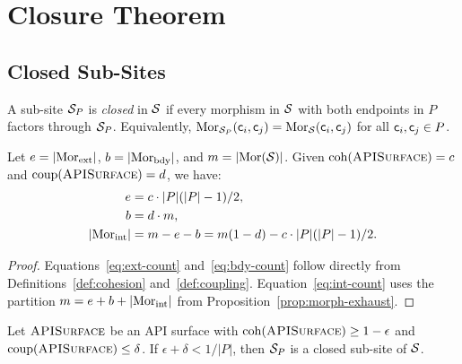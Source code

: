 \documentclass[11pt]{article}
\newcommand{\APISurface}{\textsc{APISurface}}
\newcommand{\CohIndex}{\mathrm{coh}}
\newcommand{\CoupIndex}{\mathrm{coup}}
\begin{document}
\section{Closure Theorem}\label{sec:closure}

\subsection{Closed Sub-Sites}

\begin{definition}\label{def:closed-subsite}
A sub-site $\mathcal{S}_P$ is \emph{closed} in $\mathcal{S}$ if every morphism in
$\mathcal{S}$ with both endpoints in $P$ factors through $\mathcal{S}_P$.  Equivalently,
$\mathrm{Mor}_{\mathcal{S}_P}(\mathsf{c}_i, \mathsf{c}_j) = \mathrm{Mor}_{\mathcal{S}}(\mathsf{c}_i, \mathsf{c}_j)$
for all $\mathsf{c}_i, \mathsf{c}_j \in P$.
\end{definition}

\begin{lemma}\label{lem:boundary-count}
Let $e = |\mathrm{Mor}_{\mathrm{ext}}|$, $b = |\mathrm{Mor}_{\mathrm{bdy}}|$, and
$m = |\mathrm{Mor}(\mathcal{S})|$.  Given $\CohIndex(\APISurface) = c$ and
$\CoupIndex(\APISurface) = d$, we have:
\begin{align}
  e &= c \cdot |P|(|P|-1)/2, \label{eq:ext-count}\\
  b &= d \cdot m, \label{eq:bdy-count}\\
  |\mathrm{Mor}_{\mathrm{int}}| &= m - e - b = m(1 - d) - c \cdot |P|(|P|-1)/2. \label{eq:int-count}
\end{align}
\end{lemma}

\begin{proof}
Equations~\eqref{eq:ext-count} and~\eqref{eq:bdy-count} follow directly from
Definitions~\ref{def:cohesion} and~\ref{def:coupling}.
Equation~\eqref{eq:int-count} uses the partition
$m = e + b + |\mathrm{Mor}_{\mathrm{int}}|$ from
Proposition~\ref{prop:morph-exhaust}.
\end{proof}

\begin{theorem}\label{thm:api-closure}
Let $\APISurface$ be an API surface with $\CohIndex(\APISurface) \geq
1 - \epsilon$ and $\CoupIndex(\APISurface) \leq \delta$.  If
$\epsilon + \delta < 1/|P|$, then $\mathcal{S}_P$ is a closed sub-site of $\mathcal{S}$.
\end{theorem}
\end{document}
